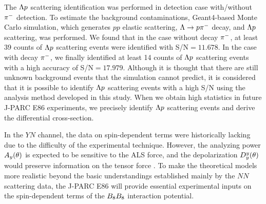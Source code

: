 The $\Lambda p$ scattering identification was performed in detection case  with/without $\pi^{-}$ detection. To estimate the background contaminations, Geant4-based Monte Carlo simulation, which generates $pp$ elastic scattering, $\Lambda\to p\pi^{-}$ decay, and $\Lambda p$ scattering, was performed. We found that in the case without decay $\pi^{-}$, at least 39 counts of $\Lambda p$ scattering events were identified with S/N$=11.678$. In the case with decay $\pi^{-}$, we finally identified at least 14 counts of $\Lambda p$ scattering events with a high accuracy of S/N$=17.979$. Although it is thought that there are still unknown background events that the simulation cannot predict, it is considered that it is possible to identify $\Lambda p$ scattering events with a high S/N using the analysis method developed in this study. When we obtain high statistics in future J-PARC E86 experiments, we precisely identify $\Lambda p$ scattering events and derive the differential cross-section.

In the $YN$ channel, the data on spin-dependent terms were historically lacking due to the difficulty of the experimental technique. However, the analyzing power $A_{y}(\theta)$ is expected to be sensitive to the ALS force, and the depolarization $D^{y}_{y}(\theta)$ would preserve information on the tensor force \cite{Ishikawa-2004}. To make the theoretical models more realistic beyond the basic understandings established mainly by the $NN$ scattering data, the J-PARC E86 will provide essential experimental inputs on the spin-dependent terms of the $B_{8}B_{8}$ interaction potential.

%
